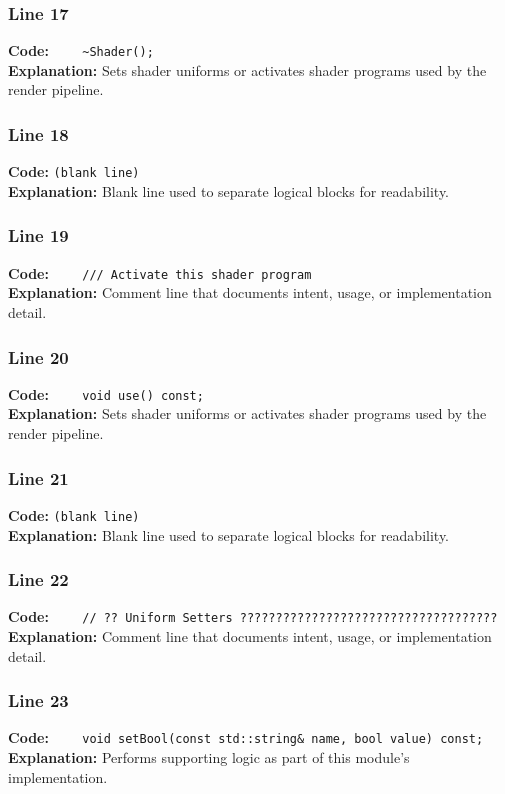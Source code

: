 \documentclass[11pt,a4paper]{article}
\begin{document}
\subsubsection*{Line 17}
\textbf{Code:} \verb|    ~Shader();|\\
\textbf{Explanation:} Sets shader uniforms or activates shader programs used by the render pipeline.

\subsubsection*{Line 18}
\textbf{Code:} \texttt{(blank line)}\\
\textbf{Explanation:} Blank line used to separate logical blocks for readability.

\subsubsection*{Line 19}
\textbf{Code:} \verb|    /// Activate this shader program|\\
\textbf{Explanation:} Comment line that documents intent, usage, or implementation detail.

\subsubsection*{Line 20}
\textbf{Code:} \verb|    void use() const;|\\
\textbf{Explanation:} Sets shader uniforms or activates shader programs used by the render pipeline.

\subsubsection*{Line 21}
\textbf{Code:} \texttt{(blank line)}\\
\textbf{Explanation:} Blank line used to separate logical blocks for readability.

\subsubsection*{Line 22}
\textbf{Code:} \verb|    // ?? Uniform Setters ????????????????????????????????????|\\
\textbf{Explanation:} Comment line that documents intent, usage, or implementation detail.

\subsubsection*{Line 23}
\textbf{Code:} \verb|    void setBool(const std::string& name, bool value) const;|\\
\textbf{Explanation:} Performs supporting logic as part of this module's implementation.
\end{document}
